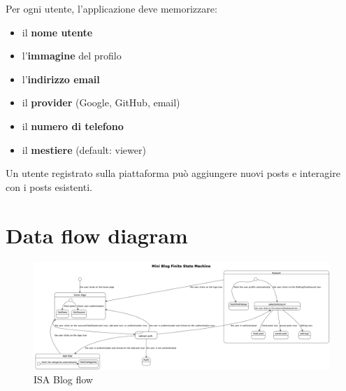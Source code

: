 \documentclass{article}
\begin{document}
Per ogni utente, l'applicazione deve memorizzare:
\begin{itemize}
    \item il \textbf{nome utente}
    \item l'\textbf{immagine} del profilo
    \item l'\textbf{indirizzo email}
    \item il \textbf{provider} (Google, GitHub, email)
    \item il \textbf{numero di telefono}
    \item il \textbf{mestiere} (default: viewer)
\end{itemize}

Un utente registrato sulla piattaforma può aggiungere nuovi posts e interagire con i posts esistenti.

\clearpage
\section{Data flow diagram}
\label{sec:data_flow_diagram}


\begin{figure}[h]
    \centering
    \includegraphics[width=1.3\textwidth]{ingblog_flow}
    \caption{ISA Blog flow}
\end{figure}
\end{document}
